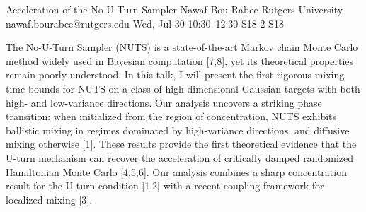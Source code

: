 \begin{talk}
  {Acceleration of the No-U-Turn Sampler}%
  {Nawaf Bou-Rabee}%
  {Rutgers University}%
  {nawaf.bourabee@rutgers.edu}%
  {}%
  {}%
  {Wed, Jul 30 10:30–12:30}%
  {S18-2}%
  {S18}%
  {}%
  
				
			

\medskip

The No-U-Turn Sampler (NUTS) is a state-of-the-art Markov chain Monte Carlo method widely used in Bayesian computation [7,8], yet its theoretical properties remain poorly understood. In this talk, I will present the first rigorous mixing time bounds for NUTS on a class of high-dimensional Gaussian targets with both high- and low-variance directions. Our analysis uncovers a striking phase transition: when initialized from the region of concentration, NUTS exhibits ballistic mixing in regimes dominated by high-variance directions, and diffusive mixing otherwise [1]. These results provide the first theoretical evidence that the U-turn mechanism can recover the acceleration of critically damped randomized Hamiltonian Monte Carlo [4,5,6].  Our analysis combines a sharp concentration result for the U-turn condition [1,2] with a recent coupling framework for localized mixing [3]. 


\end{talk}
